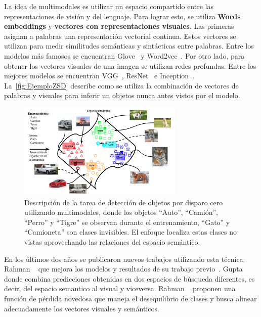 La idea de multimodales es utilizar un espacio compartido entre las representaciones de visión y del lenguaje. Para lograr esto, se utiliza  \textbf{Words embeddings} y \textbf{vectores con representaciones visuales}. Las primeras asignan a palabras una representación vectorial continua. Estos vectores se utilizan para medir similitudes semánticas y sintácticas entre palabras. Entre los modelos más famosos se encuentran Glove~\cite{pennington-etal-2014-glove} y Word2vec~\cite{mikolov2013efficient}. Por otro lado, para obtener los vectores visuales de una imagen se utilizan redes profundas. Entre los mejores modelos se encuentran VGG~\cite{simonyan2014very}, ResNet~\cite{resnet} e Inception~\cite{Szegedy_2015_CVPR}. La~\autoref{fig:EjemploZSD} describe como se utiliza la combinación de vectores de palabras y visuales para inferir un objetos nunca antes vistos por el modelo.\\

\begin{figure}[]
	\centering
	\includegraphics[width=0.7\textwidth]{img/Modelo.png}
	\caption{Descripción de la tarea de detección de objetos por disparo cero utilizando multimodales, donde los objetos ``Auto'', ``Camión'', ``Perro'' y ``Tigre'' se observan  durante el entrenamiento,  ``Gato'' y ``Camioneta'' son clases invisibles. El enfoque localiza estas clases no vistas aprovechando las relaciones del espacio semántico.}
	\label{fig:EjemploZSD}
\end{figure}

En los últimos dos años se publicaron nuevos trabajos utilizando esta técnica. Rahman \etal~\cite{rahman2020zero} que mejora los modelos y resultados de su trabajo previo~\cite{rahman2018zero}. Gupta \etal~\cite{gupta2020multi} donde combina predicciones obtenidas en dos espacios de búsqueda diferentes, es decir, del espacio semantico al visual y viceversa. Rahman \etal~\cite{rahman2020improved} proponen  una función de pérdida novedosa que maneja el desequilibrio de clases y busca alinear adecuadamente los vectores visuales y semánticos.

